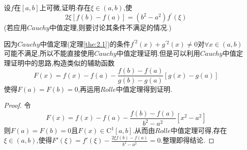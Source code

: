 \documentclass[lang=cn,newtx,10pt,scheme=chinese]{../Template/elegantbook}
\begin{document}
\begin{exercise}
设\(f\)在\([a,b]\)上可微,证明:存在\(\xi\in(a,b)\),使
\begin{equation}
2\xi[f(b)-f(a)]=(b^{2}-a^{2})f^{\prime}(\xi)
    \nonumber
\end{equation}
(若应用$Cauchy$中值定理,则要讨论其条件不满足的情况.)
\begin{note}
    因为$Cauchy$中值定理(定理\ref{the:2.1})的条件$f^{\prime2}(x)+g^{\prime2}(x)\neq0$对$\forall x\in(a,b)$可能不满足,所以不能直接使用$Cauchy$中值定理证明.但是可以利用$Cauchy$中值定理证明中的思路,构造类似的辅助函数
    \begin{equation}
    F(x)=f(x)-f(a)-\frac{f(b)-f(a)}{g\left( b \right) -g\left( a \right)}\left[ g\left( x \right) -g\left( a \right) \right] 
        \nonumber
    \end{equation}
    使得$F(a)=F(b)=0$,再运用$Rolle$中值定理得到证明.
\end{note}
\begin{proof}
    令
    \begin{equation}
    F(x)=f(x)-f(a)-\frac{f(b)-f(a)}{b^2-a^2}\left[ x^2-a^2 \right]
        \nonumber
    \end{equation}
    则$F(a)=F(b)=0$且$F(x)\in\mathrm{C}^1[a,b]$.从而由$Rolle$中值定理可得,存在$\xi\in(a,b)$,使得$F'(\xi )=f'(\xi )-\frac{2\xi f(b)-f(a)}{b^2-a^2}=0$.整理即得结论.
\end{proof}
\end{exercise}
\end{document}
